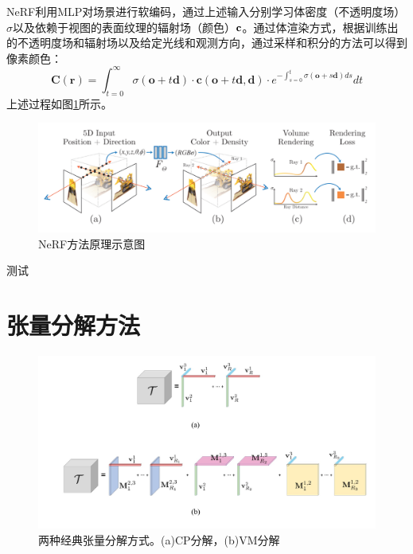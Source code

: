 \documentclass[10pt,twocolumn,letterpaper]{article}
\begin{document}
NeRF利用MLP对场景进行软编码，通过上述输入分别学习体密度（不透明度场）$\sigma$以及依赖于视图的表面纹理的辐射场（颜色）$\bold c$。通过体渲染方式，根据训练出的不透明度场和辐射场以及给定光线和观测方向，通过采样和积分的方法可以得到像素颜色：
\begin{equation}
  \mathbf{C}(\mathbf{r})=\int_{t=0}^{\infty} \sigma(\mathbf{o}+t \mathbf{d}) \cdot \mathbf{c}(\mathbf{o}+t \mathbf{d}, \mathbf{d}) \cdot e^{-\int_{s=0}^{t} \sigma(\mathbf{o}+s \mathbf{d}) d s} d t
\end{equation}
\label{eq:2}
上述过程如图\ref{fig:nerf}所示。
\begin{figure}
  \centering
  \includegraphics[width=1.0\linewidth]{fig/nerf.png}
  \caption{NeRF方法原理示意图}
  \label{fig:nerf}
\end{figure}


测试\cite{chiarot2021time}


\section{张量分解方法}
\label{sec:td}

\begin{figure}
  \centering
  \includegraphics[width=1.0\linewidth]{fig/CPVM.jpg}
  \caption{两种经典张量分解方式。(a)CP分解，(b)VM分解}
  \label{fig:cpvm}
\end{figure}
\end{document}
